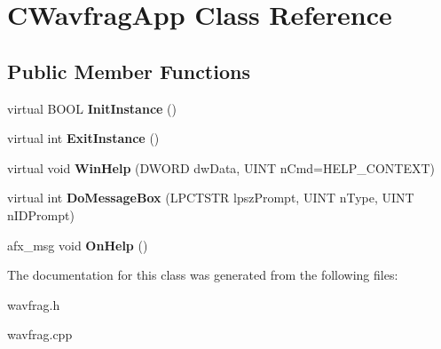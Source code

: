 \hypertarget{class_c_wavfrag_app}{\section{C\-Wavfrag\-App Class Reference}
\label{class_c_wavfrag_app}
}
\subsection*{Public Member Functions}
\begin{DoxyCompactItemize}
\item 
\hypertarget{class_c_wavfrag_app_a522832b653042b9516e712edba852a29}{virtual B\-O\-O\-L {\bfseries Init\-Instance} ()}\label{class_c_wavfrag_app_a522832b653042b9516e712edba852a29}

\item 
\hypertarget{class_c_wavfrag_app_a8ee0dc26b7d227f8f0eb83a0e619f0c9}{virtual int {\bfseries Exit\-Instance} ()}\label{class_c_wavfrag_app_a8ee0dc26b7d227f8f0eb83a0e619f0c9}

\item 
\hypertarget{class_c_wavfrag_app_a0b556ceaee730bb920859a66dc552eee}{virtual void {\bfseries Win\-Help} (D\-W\-O\-R\-D dw\-Data, U\-I\-N\-T n\-Cmd=H\-E\-L\-P\-\_\-\-C\-O\-N\-T\-E\-X\-T)}\label{class_c_wavfrag_app_a0b556ceaee730bb920859a66dc552eee}

\item 
\hypertarget{class_c_wavfrag_app_a555d8b18a13747ec9875a4c727fb4798}{virtual int {\bfseries Do\-Message\-Box} (L\-P\-C\-T\-S\-T\-R lpsz\-Prompt, U\-I\-N\-T n\-Type, U\-I\-N\-T n\-I\-D\-Prompt)}\label{class_c_wavfrag_app_a555d8b18a13747ec9875a4c727fb4798}

\item 
\hypertarget{class_c_wavfrag_app_a095ed2eb6080417fb6c1d20468bf6e30}{afx\-\_\-msg void {\bfseries On\-Help} ()}\label{class_c_wavfrag_app_a095ed2eb6080417fb6c1d20468bf6e30}

\end{DoxyCompactItemize}


The documentation for this class was generated from the following files\-:\begin{DoxyCompactItemize}
\item 
wavfrag.\-h\item 
wavfrag.\-cpp\end{DoxyCompactItemize}

